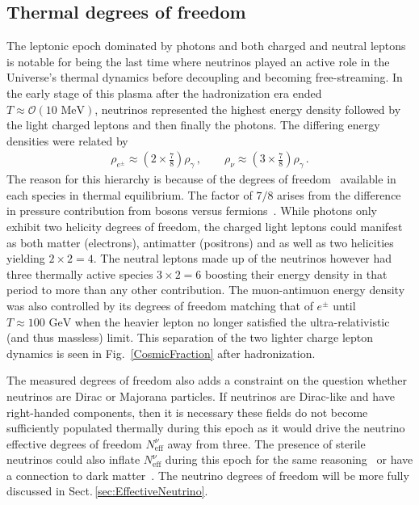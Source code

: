 \documentclass[universe,article,submit,moreauthors,pdftex,a4paper]{Definitions/mdpi}
\newcommand{\GeV}{\text{ GeV}}
\newcommand{\MeV}{\text{ MeV}}
\newcommand*{\rf}[1]{Fig.~{\ref{#1}}}
\newcommand*{\rsec}[1]{Sect.\,{\ref{#1}}}
\begin{document}
\subsection{Thermal degrees of freedom}\label{sec:Freedom}
\noindent The leptonic epoch dominated by photons and both charged and neutral leptons is notable for being the last time where neutrinos played an active role in the Universe's thermal dynamics before decoupling and becoming free-streaming. In the early stage of this plasma after the hadronization era ended $T\approx\mathcal{O}(10\MeV)$, neutrinos represented the highest energy density followed by the light charged leptons and then finally the photons. The differing energy densities were related by
\begin{align}
\rho_{e^{\pm}}\approx\left(2\times\frac{7}{8}\right)\rho_{\gamma}\,,\qquad\rho_{\nu}\approx\left(3\times\frac{7}{8}\right)\rho_{\gamma}\,.
\end{align}
The reason for this hierarchy is because of the degrees of freedom~\cite{Coleman:2003hs,Rafelski:2013yka} available in each species in thermal equilibrium. The factor of $7/8$ arises from the difference in pressure contribution from bosons versus fermions~\cite{Rafelski:2013yka}. While photons only exhibit two helicity degrees of freedom, the charged light leptons could manifest as both matter (electrons), antimatter (positrons) and as well as two helicities yielding $2\times2=4$. The neutral leptons made up of the neutrinos however had three thermally active species $3\times2=6$ boosting their energy density in that period to more than any other contribution. The muon-antimuon energy density was also controlled by its degrees of freedom matching that of $e^{\pm}$ until $T\approx100\GeV$ when the heavier lepton no longer satisfied the ultra-relativistic (and thus massless) limit. This separation of the two lighter charge lepton dynamics is seen in \rf{CosmicFraction} after hadronization.

The measured degrees of freedom also adds a constraint on the question whether neutrinos are Dirac or Majorana particles. If neutrinos are Dirac-like and have right-handed components, then it is necessary these fields do not become sufficiently populated thermally during this epoch as it would drive the neutrino effective degrees of freedom $N^{\nu}_{\mathrm{eff}}$ away from three. The presence of sterile neutrinos could also inflate $N_{\mathrm{eff}}^{\nu}$ during this epoch for the same reasoning~\cite{Kopp:2011qd,Hamann:2011ge,Kopp:2013vaa,Lello:2014yha,Birrell:2014qna} or have a connection to dark matter~\cite{Weinberg:2013kea,Giusarma:2014zza}. The neutrino degrees of freedom will be more fully discussed in \rsec{sec:EffectiveNeutrino}.
\end{document}
